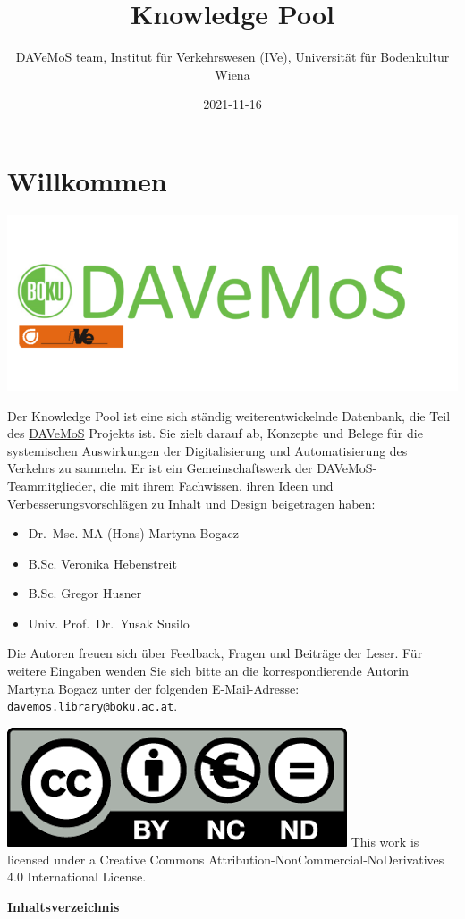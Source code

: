 \documentclass[
]{book}
\title{Knowledge Pool}
\author{DAVeMoS team, Institut für Verkehrswesen (IVe), Universität für Bodenkultur Wiena}
\date{2021-11-16}
\providecommand{\tightlist}{%
  \setlength{\itemsep}{0pt}\setlength{\parskip}{0pt}}
\begin{document}
\maketitle

{
\setcounter{tocdepth}{1}
\tableofcontents
}
\hypertarget{willkommen}{%
\chapter*{Willkommen}\label{willkommen}}

\includegraphics[width=0.4\linewidth]{image/davemos_logo}

Der Knowledge Pool ist eine sich ständig weiterentwickelnde Datenbank, die Teil des \href{https://www.davemos.online/}{DAVeMoS} Projekts ist. Sie zielt darauf ab, Konzepte und Belege für die systemischen Auswirkungen der Digitalisierung und Automatisierung des Verkehrs zu sammeln. Er ist ein Gemeinschaftswerk der DAVeMoS-Teammitglieder, die mit ihrem Fachwissen, ihren Ideen und Verbesserungsvorschlägen zu Inhalt und Design beigetragen haben:

\begin{itemize}
\tightlist
\item
  Dr.~Msc. MA (Hons) Martyna Bogacz
\item
  B.Sc. Veronika Hebenstreit
\item
  B.Sc. Gregor Husner
\item
  Univ. Prof.~Dr.~Yusak Susilo
\end{itemize}

Die Autoren freuen sich über Feedback, Fragen und Beiträge der Leser. Für weitere Eingaben wenden Sie sich bitte an die korrespondierende Autorin Martyna Bogacz unter der folgenden E-Mail-Adresse: \href{mailto:davemos.library@boku.ac.at}{\nolinkurl{davemos.library@boku.ac.at}}.

\includegraphics[width=0.1\linewidth]{image/cc}
This work is licensed under a Creative Commons Attribution-NonCommercial-NoDerivatives 4.0 International License.

\textbf{Inhaltsverzeichnis}
\end{document}
